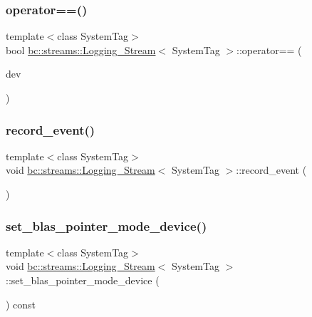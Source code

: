 \subsubsection{\texorpdfstring{operator==()}{operator==()}}
{\footnotesize\ttfamily template$<$class System\+Tag$>$ \\
bool \hyperlink{structbc_1_1streams_1_1Logging__Stream}{bc\+::streams\+::\+Logging\+\_\+\+Stream}$<$ System\+Tag $>$\+::operator== (\begin{DoxyParamCaption}\item[{const \hyperlink{structbc_1_1streams_1_1Logging__Stream}{Logging\+\_\+\+Stream}$<$ System\+Tag $>$ \&}]{dev }\end{DoxyParamCaption})\hspace{0.3cm}{\ttfamily [inline]}}

\mbox{\label{structbc_1_1streams_1_1Logging__Stream_a053b8879f3940a865cfadbc297ff2855}} 
\subsubsection{\texorpdfstring{record\+\_\+event()}{record\_event()}}
{\footnotesize\ttfamily template$<$class System\+Tag$>$ \\
void \hyperlink{structbc_1_1streams_1_1Logging__Stream}{bc\+::streams\+::\+Logging\+\_\+\+Stream}$<$ System\+Tag $>$\+::record\+\_\+event (\begin{DoxyParamCaption}{ }\end{DoxyParamCaption})\hspace{0.3cm}{\ttfamily [inline]}}

\mbox{\label{structbc_1_1streams_1_1Logging__Stream_a19102963d3bb6835417334f4c2820d40}} 
\subsubsection{\texorpdfstring{set\+\_\+blas\+\_\+pointer\+\_\+mode\+\_\+device()}{set\_blas\_pointer\_mode\_device()}}
{\footnotesize\ttfamily template$<$class System\+Tag$>$ \\
void \hyperlink{structbc_1_1streams_1_1Logging__Stream}{bc\+::streams\+::\+Logging\+\_\+\+Stream}$<$ System\+Tag $>$\+::set\+\_\+blas\+\_\+pointer\+\_\+mode\+\_\+device (\begin{DoxyParamCaption}{ }\end{DoxyParamCaption}) const\hspace{0.3cm}{\ttfamily [inline]}}

